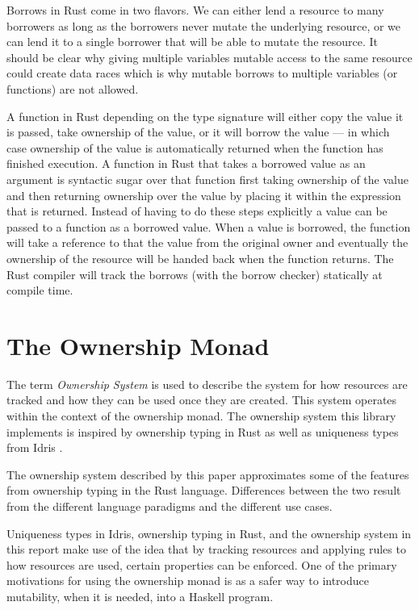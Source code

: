 \documentclass[onehalf,11pt]{beavtex}
\begin{document}
Borrows in Rust come in two flavors. We can either lend a resource to many
borrowers as long as the borrowers never mutate the underlying resource, or we
can lend it to a single borrower that will be able to mutate the
resource\cite{rust_book_borrowing}.
It should be clear why giving multiple variables mutable access to
the same resource could create data races which is why mutable borrows to
multiple variables (or functions) are not allowed.

A function in Rust depending on the type signature will either copy the value
it is passed, take ownership of the value, or it will borrow the value --- in
which case ownership of the value is automatically returned when the function
has finished execution\cite{rust_book_ownership}.
A function in Rust that takes a borrowed value as an argument is
syntactic sugar over that function first taking ownership of the value and then
returning ownership over the value by placing it within the expression that is
returned.
Instead of having to do these steps explicitly a value can be passed to a
function as a borrowed value.  When a value is borrowed, the function will take
a reference to that the value from the original owner and eventually the
ownership of the resource will be handed back when the function returns.
The Rust compiler will track the borrows (with the borrow checker) statically at
compile time.

\chapter{The Ownership Monad}

The term \textit{Ownership System} is used to describe the system for how
resources are tracked and how they can be used once they are created. This
system operates within the context of the ownership monad.
The ownership system this library implements is inspired by
ownership typing in Rust \cite{rust_book_ownership}
as well as uniqueness types from Idris \cite{idris_uniqueness_types}.

The ownership system described by this paper approximates some of the
features from ownership typing in the Rust language. Differences between
the two result from the different language paradigms and the different use
cases.

Uniqueness types in Idris, ownership typing in Rust, and the ownership system in
this report make use of the idea that by tracking resources and applying rules
to how resources are used, certain properties can be enforced.
One of the primary motivations for using the ownership monad is as a
safer way to introduce mutability, when it is needed, into a Haskell program.
\end{document}
